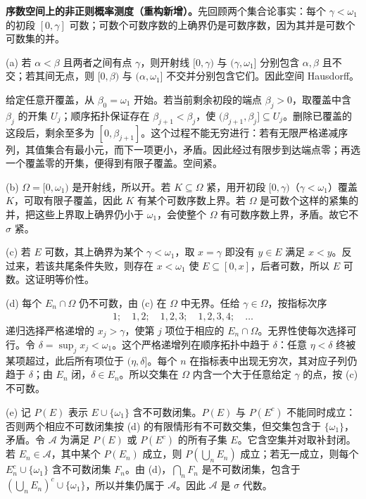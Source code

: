 \documentclass[../../main.tex]{subfiles}
\begin{document}
\begin{solution}
\textbf{序数空间上的非正则概率测度（重构新增）。}先回顾两个集合论事实：每个 $\gamma<\omega_1$ 的初段 $[0,\gamma]$ 可数；可数个可数序数的上确界仍是可数序数，因为其并是可数个可数集的并。

(a) 若 $\alpha<\beta$ 且两者之间有点 $\gamma$，则开射线 $[0,\gamma)$ 与 $(\gamma,\omega_1]$ 分别包含 $\alpha,\beta$ 且不交；若其间无点，则 $[0,\beta)$ 与 $(\alpha,\omega_1]$ 不交并分别包含它们。因此空间 Hausdorff。

给定任意开覆盖，从 $\beta_0=\omega_1$ 开始。若当前剩余初段的端点 $\beta_j>0$，取覆盖中含 $\beta_j$ 的开集 $U_j$；顺序拓扑保证存在 $\beta_{j+1}<\beta_j$，使 $(\beta_{j+1},\beta_j]\subseteq U_j$。删除已覆盖的这段后，剩余至多为 $[0,\beta_{j+1}]$。这个过程不能无穷进行：若有无限严格递减序列，其值集合有最小元，而下一项更小，矛盾。因此经过有限步到达端点零；再选一个覆盖零的开集，便得到有限子覆盖。空间紧。

(b) $\Omega=[0,\omega_1)$ 是开射线，所以开。若 $K\subseteq\Omega$ 紧，用开初段 $[0,\gamma)$（$\gamma<\omega_1$）覆盖 $K$，可取有限子覆盖，因此 $K$ 有某个可数序数上界。若 $\Omega$ 是可数个这样的紧集的并，把这些上界取上确界仍小于 $\omega_1$，会使整个 $\Omega$ 有可数序数上界，矛盾。故它不 $\sigma$ 紧。

(c) 若 $E$ 可数，其上确界为某个 $\gamma<\omega_1$，取 $x=\gamma$ 即没有 $y\in E$ 满足 $x<y$。反过来，若该共尾条件失败，则存在 $x<\omega_1$ 使 $E\subseteq[0,x]$，后者可数，所以 $E$ 可数。这证明等价性。

(d) 每个 $E_n\cap\Omega$ 仍不可数，由 (c) 在 $\Omega$ 中无界。任给 $\gamma\in\Omega$，按指标次序
\begin{align*}
1;\quad1,2;\quad1,2,3;\quad1,2,3,4;\quad\ldots
\end{align*}
递归选择严格递增的 $x_j>\gamma$，使第 $j$ 项位于相应的 $E_n\cap\Omega$。无界性使每次选择可行。令 $\delta=\sup_jx_j<\omega_1$。这个严格递增列在顺序拓扑中趋于 $\delta$：任意 $\eta<\delta$ 终被某项超过，此后所有项位于 $(\eta,\delta]$。每个 $n$ 在指标表中出现无穷次，其对应子列仍趋于 $\delta$；由 $E_n$ 闭，$\delta\in E_n$。所以交集在 $\Omega$ 内含一个大于任意给定 $\gamma$ 的点，按 (c) 不可数。

(e) 记 $P(E)$ 表示 $E\cup\{\omega_1\}$ 含不可数闭集。$P(E)$ 与 $P(E^c)$ 不能同时成立：否则两个相应不可数闭集按 (d) 的有限情形有不可数交集，但交集包含于 $\{\omega_1\}$，矛盾。令 $\mathscr A$ 为满足 $P(E)$ 或 $P(E^c)$ 的所有子集 $E$。它含空集并对取补封闭。若 $E_n\in\mathscr A$，其中某个 $P(E_n)$ 成立，则 $P(\bigcup_nE_n)$ 成立；若无一成立，则每个 $E_n^c\cup\{\omega_1\}$ 含不可数闭集 $F_n$。由 (d)，$\bigcap_nF_n$ 是不可数闭集，包含于 $(\bigcup_nE_n)^c\cup\{\omega_1\}$，所以并集仍属于 $\mathscr A$。因此 $\mathscr A$ 是 $\sigma$ 代数。


\end{solution}
\end{document}
